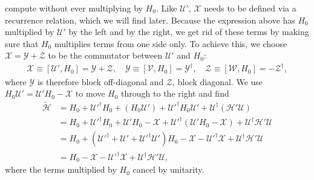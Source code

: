 compute without ever multiplying by $H_0$.
Like $\mathcal{U}'$, $\mathcal{X}$ needs to be defined via a recurrence
relation, which we will find later.
Because the expression above has $H_0$ multiplied by $\mathcal{U}'$ by the left
and by the right, we get rid of these terms by making sure that $H_0$
multiplies terms from one side only.
To achieve this, we choose $\mathcal{X}=\mathcal{Y}+\mathcal{Z}$ to be the commutator between
$\mathcal{U}'$ and $H_0$:
%
\begin{align}
\label{eq:XYZ}
\mathcal{X} \equiv [\mathcal{U}', H_0] = \mathcal{Y} + \mathcal{Z}, \quad
\mathcal{Y} \equiv [\mathcal{V}, H_0] = \mathcal{Y}^\dagger,\quad
\mathcal{Z} \equiv [\mathcal{W}, H_0] = -\mathcal{Z}^\dagger,
\end{align}
%
where $\mathcal{Y}$ is therefore block off-diagonal and $\mathcal{Z}$, block
diagonal.
We use $H_0 \mathcal{U}' = \mathcal{U}' H_0 -\mathcal{X}$ to move $H_0$ through
to the right and find
%
\begin{align}
\label{eq:H_tilde}
  \tilde{\mathcal{H}}
  &= H_0 + \mathcal{U}'^\dagger H_0 + (H_0 \mathcal{U}') + \mathcal{U}'^\dagger H_0
  \mathcal{U}' + \mathcal{U}^\dagger(\mathcal{H'}\mathcal{U})
  \\
  &= H_0 + \mathcal{U}'^\dagger H_0 + \mathcal{U}'H_0 - \mathcal{X} + \mathcal{U}'^\dagger (\mathcal{U}' H_0 - \mathcal{X}) + \mathcal{U}^\dagger\mathcal{H'}\mathcal{U}\\
  &= H_0 + (\mathcal{U}'^\dagger + \mathcal{U}' + \mathcal{U}'^\dagger \mathcal{U}')H_0 - \mathcal{X} - \mathcal{U}'^\dagger \mathcal{X} + \mathcal{U}^\dagger\mathcal{H'}\mathcal{U}\\
  &= H_0 - \mathcal{X} - \mathcal{U}'^\dagger \mathcal{X} + \mathcal{U}^\dagger\mathcal{H'}\mathcal{U},
\end{align}
%
where the terms multiplied by $H_0$ cancel by unitarity.

